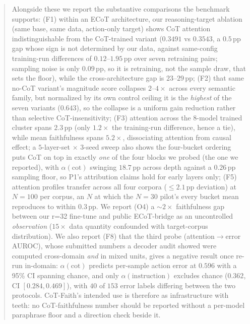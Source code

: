 \documentclass{article}
\begin{document}
\begin{abstract}
Alongside these we report the substantive comparisons the benchmark supports: (F1) within an ECoT architecture, our reasoning-target ablation (same base, same data, action-only target) shows CoT attention indistinguishable from the CoT-trained variant ($0.3491$ vs $0.3543$, a $0.5$\,pp gap whose sign is not determined by our data, against same-config training-run differences of $0.12$--$1.95$\,pp over seven retraining pairs; sampling noise is only $0.09$\,pp, so it is retraining, not the sample draw, that sets the floor), while the cross-architecture gap is $23$--$29$\,pp; (F2) that same no-CoT variant's magnitude score collapses $2\text{--}4\times$ across every semantic family, but normalized by its own control ceiling it is the \emph{highest} of the seven variants ($0.643$), so the collapse is a uniform gain reduction rather than selective CoT-insensitivity; (F3) attention across the 8-model trained cluster spans $2.3$\,pp (only $1.2\times$ the training-run difference, hence a tie), while mean faithfulness spans $5.2\times$, dissociating attention from causal effect; a $5$-layer-set $\times$ $3$-seed sweep also shows the four-bucket ordering puts CoT on top in exactly \emph{one} of the four blocks we probed (the one we reported), with $\alpha(\text{cot})$ swinging $18.7$\,pp across depth against a $0.26$\,pp sampling floor, so P1's attribution claims hold for early layers only; (F5) attention profiles transfer across all four corpora ($\leq 2.1$\,pp deviation) at $N{=}100$ per corpus, an $N$ at which the $N{=}30$ pilot's every bucket mean reproduces to within $0.3$\,pp. We report (O4) a $\sim 2\times$ faithfulness gap between our r=32 fine-tune and public ECoT-bridge as an uncontrolled \emph{observation} ($15\times$ data quantity confounded with target-corpus distribution). We also report (F8) that the third probe (attention$\to$error AUROC), whose submitted numbers a decoder audit showed were computed cross-domain \emph{and} in mixed units, gives a negative result once re-run in-domain: $\alpha(\text{cot})$ predicts per-sample action error at $0.596$ with a 95\% CI spanning chance, and only $\alpha(\text{instruction})$ excludes chance ($0.362$, CI $[0.284,0.469]$), with $40$ of $153$ error labels differing between the two protocols. CoT-Faith's intended use is therefore as infrastructure with teeth: no CoT-faithfulness number should be reported without a per-model paraphrase floor and a direction check beside it.
\end{abstract}

\end{document}
